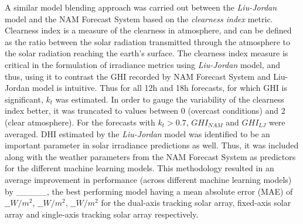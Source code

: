 \par A similar model blending approach was carried out between the \textit{Liu-Jordan} model and the NAM Forecast System based on the \textit{clearness index} metric. Clearness index is a measure of the clearness in atmosphere, and can be defined as the ratio between the solar radiation transmitted through the atmosphere to the solar radiation reaching the earth's surface. The clearness index measure is critical in the formulation of irradiance metrics using \textit{Liu-Jordan} model, and thus, using it to contrast the GHI recorded by NAM Forecast System and Liu-Jordan model is intuitive. Thus for all 12h and 18h forecasts, for which GHI is significant, $k_t$ was estimated. In order to gauge the variability of the clearness index better, it was truncated to values between 0 (overcast conditions) and 2 (clear atmosphere). For the forecasts with $k_t > 0.7$, $GHI_{NAM}$ and $GHI_{LJ}$ were averaged. DHI estimated by the \textit{Liu-Jordan} model was identified to be an important parameter in solar irradiance predictions as well. Thus, it was included along with the weather parameters from the NAM Forecast System as predictors for the different machine learning models. This methodology resulted in an average improvement in performance (across different machine learning models) by \_\_\_\_\_, the best performing model having a mean absolute error (MAE) of $\_\_ W/m^2$, $\_\_ W/m^2$, $\_\_ W/m^2$ for the dual-axis tracking solar array, fixed-axis solar array and single-axis tracking solar array respectively.

\newpage